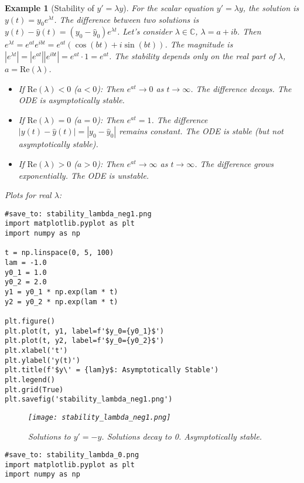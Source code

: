 \documentclass{article}
\newtheorem{example}{Example}
\begin{document}
\begin{example}[Stability of $y' = \lambda y$]
For the scalar equation $y' = \lambda y$, the solution is $y(t) = y_0 e^{\lambda t}$. The difference between two solutions is $y(t) - \hat{y}(t) = (y_0 - \hat{y}_0) e^{\lambda t}$.
Let's consider $\lambda \in \mathbb{C}$, $\lambda = a + ib$. Then $e^{\lambda t} = e^{at} e^{ibt} = e^{at}(\cos(bt) + i \sin(bt))$. The magnitude is $|e^{\lambda t}| = |e^{at}| |e^{ibt}| = e^{at} \cdot 1 = e^{at}$. The stability depends only on the real part of $\lambda$, $a = \text{Re}(\lambda)$.

\begin{itemize}
    \item If $\text{Re}(\lambda) < 0$ ($a < 0$): Then $e^{at} \to 0$ as $t \to \infty$. The difference decays. The ODE is asymptotically stable.
    \item If $\text{Re}(\lambda) = 0$ ($a = 0$): Then $e^{at} = 1$. The difference $|y(t) - \hat{y}(t)| = |y_0 - \hat{y}_0|$ remains constant. The ODE is stable (but not asymptotically stable).
    \item If $\text{Re}(\lambda) > 0$ ($a > 0$): Then $e^{at} \to \infty$ as $t \to \infty$. The difference grows exponentially. The ODE is unstable.
\end{itemize}

Plots for real $\lambda$:
\begin{verbatim}
#save_to: stability_lambda_neg1.png
import matplotlib.pyplot as plt
import numpy as np

t = np.linspace(0, 5, 100)
lam = -1.0
y0_1 = 1.0
y0_2 = 2.0
y1 = y0_1 * np.exp(lam * t)
y2 = y0_2 * np.exp(lam * t)

plt.figure()
plt.plot(t, y1, label=f'$y_0={y0_1}$')
plt.plot(t, y2, label=f'$y_0={y0_2}$')
plt.xlabel('t')
plt.ylabel('y(t)')
plt.title(f'$y\' = {lam}y$: Asymptotically Stable')
plt.legend()
plt.grid(True)
plt.savefig('stability_lambda_neg1.png')
\end{verbatim}

\begin{figure}[h]
    \centering
    \texttt{[image: stability\_lambda\_neg1.png]}
    \caption{Solutions to $y'=-y$. Solutions decay to 0. Asymptotically stable.}
    \label{fig:stability_lambda_neg1}
\end{figure}

\begin{verbatim}
#save_to: stability_lambda_0.png
import matplotlib.pyplot as plt
import numpy as np


\end{verbatim}
\end{example}
\end{document}
